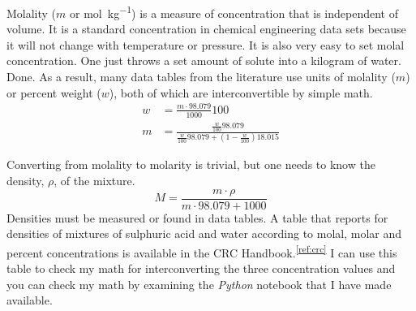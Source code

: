 \documentclass[]{tufte-handout}
\newcommand{\tss}[1]{\textsuperscript{#1}}
\begin{document}
Molality ($m$ or \unit{\mole\per\kilo\gram}) is a measure of concentration that is independent of volume. It is a standard concentration in chemical engineering data sets because it will not change with temperature or pressure. It is also very easy to set molal concentration. One just throws a set amount of solute into a kilogram of water. Done. As a result, many data tables from the literature use units of molality ($m$) or percent weight ($w$), both of which are interconvertible by simple math.
\begin{align}
w &= \frac{m \cdot 98.079}{1000}100 \\
m &= \frac{\frac{w}{100}98.079}{\frac{w}{100}98.079 + \left(1-\frac{w}{100}\right)18.015}
\end{align}


Converting from molality to molarity is trivial, but one needs to know the density, $\rho$, of the mixture.
\begin{equation}
M =  \frac{m\cdot \rho}{m \cdot 98.079 + 1000}
\end{equation}
Densities must be measured or found in data tables. A table that reports for densities of mixtures of sulphuric acid and water according to molal, molar and percent concentrations is available in the CRC Handbook.\tss{\ref{ref:crc}} I can use this table to check my math for interconverting the three concentration values and you can check my math by examining the \textit{Python} notebook that I have made available.
\end{document}
